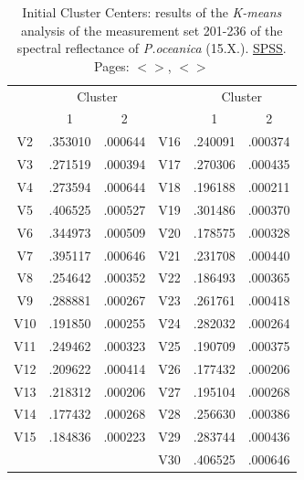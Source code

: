 \documentclass[11pt]{article}
\begin{document}
\begin{appendices}
\begin{table}[H]
	\caption{Initial Cluster Centers: results of the \textit{K-means} analysis of the measurement set 201-236 of the spectral reflectance of \textit{P.oceanica} (15.X.).  \href{http://www.spss.com/}{SPSS}.  Pages: $<$\pageref{page-30}$>$, $<$\pageref{page-41}$>$}
	\label{tab:13}
	\begin{center}
	\begin{tabular}{|c|c|c|c|c|c|}
		\hline\hline
		& \multicolumn{2}{|c|}{Cluster} &  & \multicolumn{2}{|c|}{Cluster}\\
		 & 1 & 2 &  & 1 & 2 \\ \hline\hline
		V2 &	.353010 &	.000644 &	V16 &	.240091 &	.000374 \\ \hline
		V3 &	 .271519 &	.000394 &	V17 &	.270306 &	.000435 \\ \hline
		V4 &	.273594 &	.000644 &	V18 &	.196188 &	.000211 \\ \hline
		V5 &	.406525 &	.000527 &	V19 &	.301486 &	.000370 \\ \hline
		V6 &	.344973 &	.000509 &	V20 &	.178575 &	.000328 \\ \hline
		V7 &	.395117 &	.000646 &	V21 &	.231708 &	.000440 \\ \hline
		V8 &	.254642 &	.000352 &	V22 &	.186493 &	.000365 \\ \hline
		V9 &	.288881 &	.000267 &	V23 &	.261761 &	.000418 \\ \hline
		V10 &	.191850 &	.000255 &	V24 &	.282032 &	.000264 \\ \hline
		V11 &	.249462 &	.000323 &	V25 &	.190709 &	.000375 \\ \hline
		V12 &	.209622 &	.000414 &	V26 &	.177432 &	.000206 \\ \hline
		V13 &	.218312 &	.000206 &	V27 &	.195104 &	.000268 \\ \hline
		V14 &	.177432 &	.000268 &	V28 &	.256630 &	.000386 \\ \hline
		V15 &	.184836 &	.000223 &	V29 &	.283744 &	.000436 \\ \hline
		 &	 &	 &		V30 &	.406525 &	.000646 \\ \hline
	\end{tabular}
	\end{center}
	\label{tab:20}
\end{table}


\end{appendices}
\end{document}
